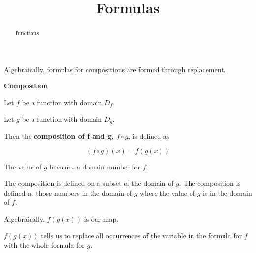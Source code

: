 \documentclass{ximera}
\title{Formulas}
\begin{document}
\begin{abstract}
functions
\end{abstract}
\maketitle



Algebraically, formulas for compositions are formed through replacement.





\begin{idea} \textbf{\textcolor{blue!55!black}{Composition}}  


Let $f$ be a function with domain $D_f$.


Let $g$ be a function with domain $D_g$.




Then the \textbf{composition of f and g, $f \circ g$,} is defined as

\[
(f \circ g)(x) = f(g(x))
\] 


The value of $g$ becomes a domain number for $f$.


The composition is defined on a subset of the domain of $g$.  The composition is defined at those numbers in the domain of $g$ where the value of $g$ is in the domain of $f$.




\end{idea}





Algebraically, $f(g(x))$ is our map. 


$f(g(x))$ tells us to replace all occurrences of the variable in the formula for $f$ with the whole formula for $g$. 
\end{document}
